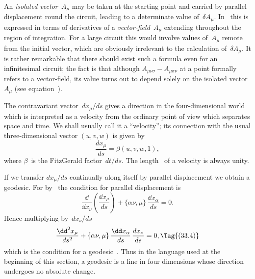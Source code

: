 \documentclass[12pt]{book}
\begin{document}
An \emph{isolated vector~$A_{\mu}$} may be taken at the starting point and carried by
parallel displacement round the circuit, leading to a determinate value of~$\delta A_{\mu}$.
%
%
In~ this is expressed in terms of derivatives of a \emph{vector-field~$A_{\mu}$} extending
throughout the region of integration. For a large circuit this would involve
values of~$A_{\mu}$ remote from the initial vector, which are obviously irrelevant to
the calculation of~$\delta A_{\mu}$. It is rather remarkable that there should exist such
a formula even for an infinitesimal circuit; the fact is that although $A_{\mu\nu\sigma} - A_{\mu\sigma\nu}$
at a point formally refers to a vector-field, its value turns out to depend solely
on the isolated vector~$A_{\mu}$ (see equation~).

The contravariant vector~$dx_{\mu}/ds$ gives a direction in the four-dimensional
world which is interpreted as a velocity from the ordinary point of view which
separates space and time. We shall usually call it a ``velocity''; its connection
with the usual three-dimensional vector $(u, v, w)$ is given by
\[
\frac{dx_{\mu}}{ds} = \beta(u, v, w, 1),
\]
where $\beta$~is the FitzGerald factor~$dt/ds$. The length~ of a velocity is
always unity.

If we transfer $dx_{\mu}/ds$ continually along itself by parallel displacement we
obtain a geodesic. For by~ the condition for parallel displacement is
\[
\frac{\dd}{\dd x_{\nu}} \left(\frac{\dd x_{\mu}}{ds}\right) + \{\alpha\nu, \mu\}\, \frac{\dd x_{\alpha}}{ds} = 0.
\]
Hence multiplying by~$dx_{\nu}/ds$
\[
\frac{\dd^{2} x_{\mu}}{ds^{2}} + \{\alpha\nu, \mu\}\, \frac{\dd x_{\alpha}}{ds}\, \frac{dx_{\nu}}{ds} = 0,
\Tag{(33.4)}
\]
which is the condition for a geodesic~. Thus in the language used at
the beginning of this section, a geodesic is a line in four dimensions whose
direction undergoes no absolute change.

\end{document}
